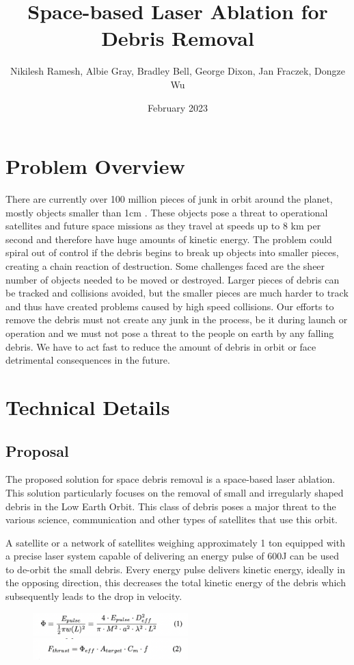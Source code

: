 \documentclass{article}
\title{Space-based Laser Ablation for Debris Removal}
\author{Nikilesh Ramesh, Albie Gray, Bradley Bell, George Dixon, Jan Fraczek, Dongze Wu}
\date{February 2023}
\begin{document}

\tableofcontents
\newpage

\section{Problem Overview}

There are currently over 100 million pieces of junk in orbit around the planet, mostly objects smaller than 1cm \cite{EYHwebsite}. These objects pose a threat to operational satellites and future space missions as they travel at speeds up to 8 km per second \cite{ESA} and therefore have huge amounts of kinetic energy. The problem could spiral out of control if the debris begins to break up objects into smaller pieces, creating a chain reaction of destruction. Some challenges faced are the sheer number of objects needed to be moved or destroyed. Larger pieces of debris can be tracked and collisions avoided, but the smaller pieces are much harder to track and thus have created problems caused by high speed collisions. Our efforts to remove the debris must not create any junk in the process, be it during launch or operation and we must not pose a threat to the people on earth by any falling debris.  We have to act fast to reduce the amount of debris in orbit or face detrimental consequences in the future.
\section{Technical Details}
\subsection{Proposal}
The proposed solution for space debris removal is a space-based laser ablation. This solution particularly focuses on the removal of small and irregularly shaped debris in the Low Earth Orbit. This class of debris poses a major threat to the various science, communication and other types of satellites that use this orbit. 

A satellite or a network of satellites weighing approximately 1 ton equipped with a precise laser system capable of delivering an energy pulse of 600J \cite{SBL} can be used to de-orbit the small debris. Every energy pulse delivers kinetic energy, ideally in the opposing direction, this decreases the total kinetic energy of the debris which subsequently leads to the drop in velocity. 
    \begin{figure}[htp]
            \centering
            \includegraphics[width=6cm]{Images/EDen.png}
            \includegraphics[width=6cm]{Images/Thrust.png}
            \label{fig:EYH}
        \end{figure}
\end{document}
